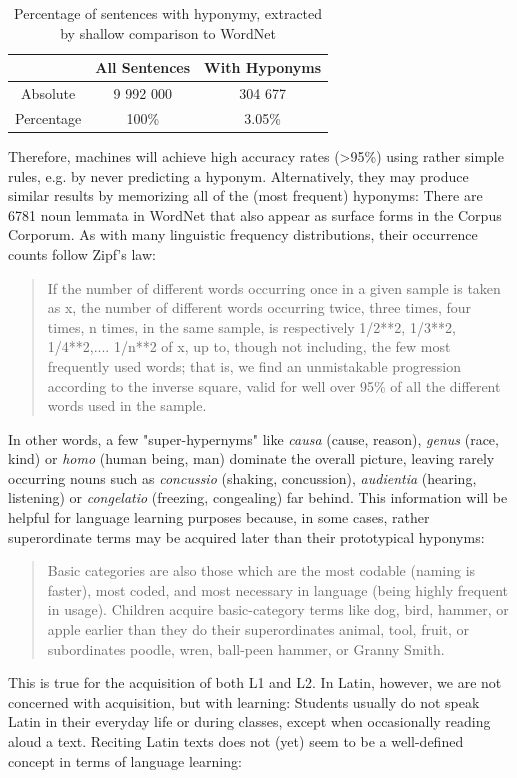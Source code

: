\documentclass[jou]{apa6} %
\begin{document}
\begin{table}[ht]
	\begin{tabular}{ c | c | c }
  		 & All Sentences & With Hyponyms \\ \hline
  		Absolute & 9 992 000 & 304 677 \\
  		Percentage & 100\% & 3.05\%  \\
	\end{tabular}
	\caption{Percentage of sentences with hyponymy, extracted by shallow comparison to WordNet}
	\label{table:hyponymyPercentageShallow}
\end{table}

Therefore, machines will achieve high accuracy rates (>95\%) using rather simple rules, e.g. by never predicting a hyponym. Alternatively, they may produce similar results by memorizing all of the (most frequent) hyponyms: There are 6781 noun lemmata in WordNet that also appear as surface forms in the Corpus Corporum. As with many linguistic frequency distributions, their occurrence counts follow Zipf's law: 
\blockquote[{\cite[p.~VI]{zipfPsychobiologyLanguageIntroduction1936}}]{If the number of different words occurring once in a given sample is taken as x, the number of different words occurring twice, three times, four times, n times, in the same sample, is respectively 1/2**2, 1/3**2, 1/4**2,.... 1/n**2 of x, up to, though not including, the few most frequently used words; that is, we find an unmistakable progression according to the inverse square, valid for well over 95\% of all the different words used in the sample.}
In other words, a few "super-hypernyms" like \textit{causa} (cause, reason), \textit{genus} (race, kind) or \textit{homo} (human being, man) dominate the overall picture, leaving rarely occurring nouns such as  \textit{concussio} (shaking, concussion),  \textit{audientia} (hearing, listening) or  \textit{congelatio} (freezing, congealing) far behind. This information will be helpful for language learning purposes because, in some cases, rather superordinate terms may be acquired later than their prototypical hyponyms:
\blockquote[{\cite[p.~27]{ellisUsagebasedLanguageInvestigating2013}}]{Basic categories are also those which are the most codable (naming is faster), most coded, and most necessary in language (being highly frequent in usage). Children acquire basic-category terms like dog, bird, hammer, or apple earlier than they do their superordinates animal, tool, fruit, or subordinates poodle, wren, ball-peen hammer, or Granny Smith.}
This is true for the acquisition of both L1 and L2. In Latin, however, we are not concerned with acquisition, but with learning: Students usually do not speak Latin in their everyday life or during  classes, except when occasionally reading aloud a text. Reciting Latin texts does not (yet) seem to be a well-defined concept in terms of language learning:
\end{document}
